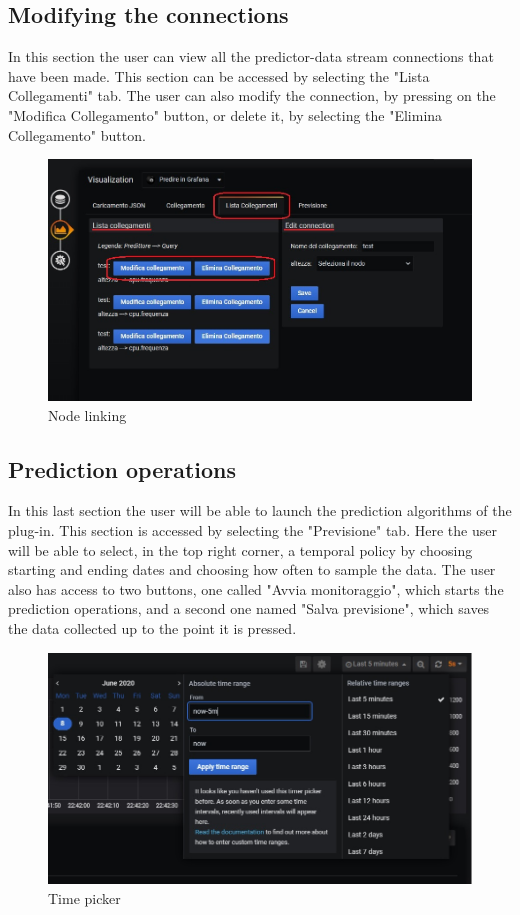 \subsection{Modifying the connections}
In this section the user can view all the predictor-data stream connections that have been made. This section can be accessed by selecting the "Lista Collegamenti" tab.
The user can also modify the connection, by pressing on the "Modifica Collegamento" button, or delete it, by selecting the "Elimina Collegamento" button.

\begin{figure}[H]
\centering
\includegraphics[scale=0.75]{img/plug-in/collegamento_node.jpg}
\caption{Node linking}
\end{figure}


\subsection{Prediction operations}
In this last section the user will be able to launch the prediction algorithms of the plug-in. This section is accessed by selecting the "Previsione" tab. Here the user will be able to select, in the top right corner, a temporal policy by choosing starting and ending dates and choosing how often to sample the data. The user  also has access to two buttons, one called "Avvia monitoraggio", which starts the prediction operations, and a second one named "Salva previsione", which saves the data collected up to the point it is pressed.\\

\begin{figure}[H]
\centering
\includegraphics[scale=0.95]{img/plug-in/time_selector.jpg}
\caption{Time picker}
\end{figure}

